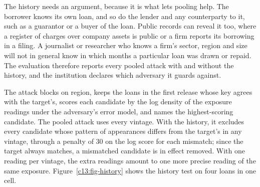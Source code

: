 The history needs an argument, because it is what lets pooling help. The borrower
knows its own loan, and so do the lender and any counterparty to it, such as a
guarantor or a buyer of the loan. Public records can reveal it too, where a register
of charges over company assets is public or a firm reports its borrowing in a filing.
A journalist or researcher who knows a firm's sector, region and size will not in
general know in which months a particular loan was drawn or repaid. The evaluation
therefore reports every pooled attack with and without the history, and the
institution declares which adversary it guards against.

The attack blocks on region, keeps the loans in the first release whose key agrees
with the target's, scores each candidate by the log density of the exposure readings
under the adversary's error model, and names the highest-scoring candidate. The
pooled attack uses every vintage. With the history, it excludes every candidate whose
pattern of appearances differs from the target's in any vintage, through a penalty of
30 on the log score for each mismatch; since the target always matches, a mismatched
candidate is in effect removed. With one reading per vintage, the extra readings
amount to one more precise reading of the same exposure.
Figure~\ref{c13:fig-history} shows the history test on four loans in one cell.

